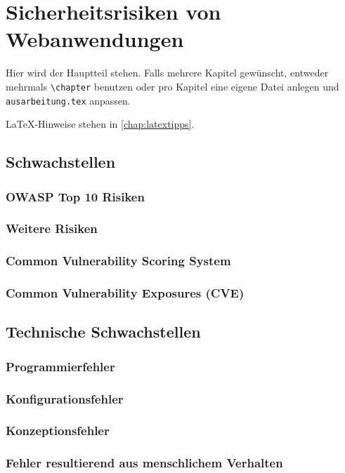 \chapter{Sicherheitsrisiken von Webanwendungen}
\label{chap:k3}

Hier wird der Hauptteil stehen. Falls mehrere Kapitel gewünscht, entweder mehrmals \texttt{\textbackslash{}chapter} benutzen oder pro Kapitel eine eigene Datei anlegen und \texttt{ausarbeitung.tex} anpassen.

LaTeX-Hinweise stehen in \cref{chap:latextipps}.

\section{Schwachstellen}

\subsection{OWASP Top 10 Risiken}

\subsection{Weitere Risiken}

\subsection{Common Vulnerability Scoring System}

\subsection{Common Vulnerability Exposures (CVE)}

\section{Technische Schwachstellen}

\subsection{Programmierfehler}

\subsection{Konfigurationsfehler}

\subsection{Konzeptionsfehler}

\subsection{Fehler resultierend aus menschlichem Verhalten}